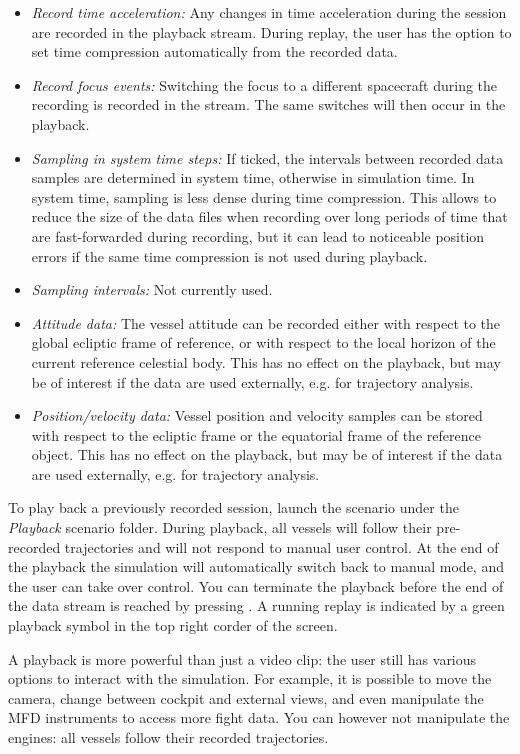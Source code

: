 \documentclass[Orbiter User Manual.tex]{subfiles}
\begin{document}
\begin{itemize}
	\item \emph{Record time acceleration:} Any changes in time acceleration
		during the session are recorded in the playback stream. During replay,
		the user has the option to set time compression automatically from the
		recorded data.
	\item \emph{Record focus events:} Switching the focus to a different
		spacecraft during the recording is recorded in the stream. The same
		switches will then occur in the playback.
	\item \emph{Sampling in system time steps:} If ticked, the intervals between
		recorded data samples are determined in system time, otherwise in
		simulation time. In system time, sampling is less dense during time
		compression. This allows to reduce the size of the data files when
		recording over long periods of time that are fast-forwarded during
		recording, but it can lead to noticeable position errors if the same
		time compression is not used during playback.
	\item \emph{Sampling intervals:} Not currently used.
	\item \emph{Attitude data:} The vessel attitude can be recorded either with
		respect to the global ecliptic frame of reference, or with respect to
		the local horizon of the current reference celestial body. This has no
		effect on the playback, but may be of interest if the data are used
		externally, e.g. for trajectory analysis.
	\item \emph{Position/velocity data:} Vessel position and velocity samples
		can be stored with respect to the ecliptic frame or the equatorial frame
		of the reference object. This has no effect on the playback, but may be
		of interest if the data are used externally, e.g. for trajectory
		analysis.
\end{itemize}

To play back a previously recorded session, launch the scenario under the
\emph{Playback} scenario folder. During playback, all vessels will follow their
pre-recorded trajectories and will not respond to manual user control. At the
end of the playback the simulation will automatically switch back to manual
mode, and the user can take over control. You can terminate the playback before
the end of the data stream is reached by pressing . A running
replay is indicated by a green playback symbol in the top right corder of the
screen.

A playback is more powerful than just a video clip: the user still has various
options to interact with the simulation. For example, it is possible to move the
camera, change between cockpit and external views, and even manipulate the MFD
instruments to access more fight data. You can however not manipulate the
engines: all vessels follow their recorded trajectories.
\end{document}
